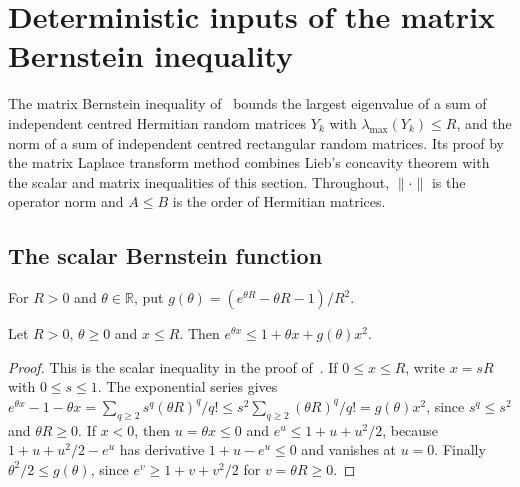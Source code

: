 \section{Deterministic inputs of the matrix Bernstein inequality}
\label{sec:matrix_bernstein_inputs}


The matrix Bernstein inequality of~\cite[Theorems~1.4 and~1.6]{Tropp2012User}
bounds the largest eigenvalue of a sum of independent centred Hermitian random
matrices $Y_k$ with $\lambda_{\max}(Y_k)\le R$, and the norm of a sum of
independent centred rectangular random matrices. Its proof by the matrix Laplace
transform method combines Lieb's concavity theorem with the scalar and matrix
inequalities of this section. Throughout, $\|\cdot\|$ is the operator norm and
$A\le B$ is the order of Hermitian matrices.

\subsection{The scalar Bernstein function}

\begin{definition}
    \label{def:bernstein_function}
    \leanok
    For $R>0$ and $\theta\in\mathbb{R}$, put
    $g(\theta)=(e^{\theta R}-\theta R-1)/R^{2}$.
\end{definition}

\begin{theorem}
    \label{thm:scalar_bernstein_bound}
    \leanok
    Let $R>0$, $\theta\ge0$ and $x\le R$. Then
    $e^{\theta x}\le1+\theta x+g(\theta)x^{2}$.
\end{theorem}
\begin{proof}\leanok
    This is the scalar inequality in the proof
    of~\cite[Lemma~6.7]{Tropp2012User}. If $0\le x\le R$, write $x=sR$ with
    $0\le s\le1$. The exponential series gives
    $e^{\theta x}-1-\theta x=\sum_{q\ge2}s^{q}(\theta R)^{q}/q!
        \le s^{2}\sum_{q\ge2}(\theta R)^{q}/q!=g(\theta)x^{2}$,
    since $s^{q}\le s^{2}$ and $\theta R\ge0$. If $x<0$, then
    $u=\theta x\le0$ and $e^{u}\le1+u+u^{2}/2$, because
    $1+u+u^{2}/2-e^{u}$ has derivative $1+u-e^{u}\le0$ and vanishes at $u=0$.
    Finally $\theta^{2}/2\le g(\theta)$, since
    $e^{v}\ge1+v+v^{2}/2$ for $v=\theta R\ge0$.
\end{proof}

